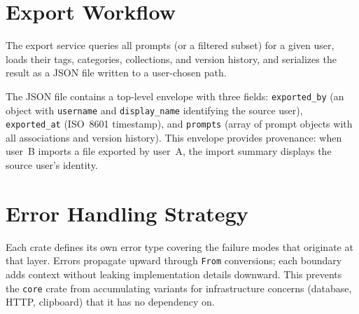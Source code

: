 \documentclass[a4paper, 11pt, oneside]{report}
\begin{document}
\section{Export Workflow}
\label{sec:export-workflow}

The export service queries all prompts (or a filtered subset) for a given
user, loads their tags, categories, collections, and version history, and
serializes the result as a JSON file written to a user-chosen path.

The JSON file contains a top-level envelope with three fields:
\texttt{exported\_by} (an object with \texttt{username} and
\texttt{display\_name} identifying the source user),
\texttt{exported\_at} (ISO~8601 timestamp), and \texttt{prompts}
(array of prompt objects with all associations and version history).
This envelope provides provenance: when user~B imports a file exported
by user~A, the import summary displays the source user's identity.

\section{Error Handling Strategy}
\label{sec:error-handling}

Each crate defines its own error type covering the failure modes that
originate at that layer.  Errors propagate upward through \texttt{From}
conversions; each boundary adds context without leaking implementation
details downward.  This prevents the \texttt{core} crate from
accumulating variants for infrastructure concerns (database, HTTP,
clipboard) that it has no dependency on.
\end{document}
